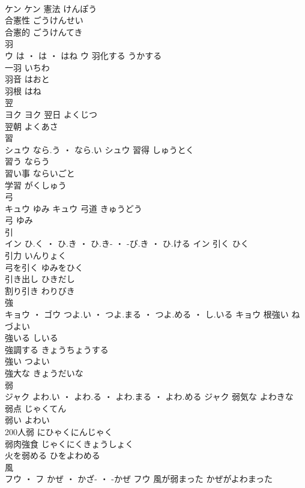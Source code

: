 \documentclass[8pt]{extreport}
\begin{document}
\begin{CJK}{UTF8}{min}
\\	ケン		ケン	憲法	けんぽう	
\\	合憲性	ごうけんせい	
\\	合憲的	ごうけんてき	
\\	羽	
\\	ウ	は ・ は ・ はね	ウ	羽化する	うかする	
\\	一羽	いちわ	
\\	羽音	はおと	
\\	羽根	はね	
\\	翌	
\\	ヨク		ヨク	翌日	よくじつ	
\\	翌朝	よくあさ	
\\	習	
\\	シュウ	なら.う ・ なら.い	シュウ	習得	しゅうとく	
\\	習う	ならう	
\\	習い事	ならいごと	
\\	学習	がくしゅう	
\\	弓	
\\	キュウ	ゆみ	キュウ	弓道	きゅうどう	
\\	弓	ゆみ	
\\	引	
\\	イン	ひ.く ・ ひ.き ・ ひ.き- ・ -び.き ・ ひ.ける	イン	引く	ひく	
\\	引力	いんりょく	
\\	弓を引く	ゆみをひく	
\\	引き出し	ひきだし	
\\	割り引き	わりびき	
\\	強	
\\	キョウ ・ ゴウ	つよ.い ・ つよ.まる ・ つよ.める ・ し.いる	キョウ	根強い	ねづよい	
\\	強いる	しいる	
\\	強調する	きょうちょうする	
\\	強い	つよい	
\\	強大な	きょうだいな	
\\	弱	
\\	ジャク	よわ.い ・ よわ.る ・ よわ.まる ・ よわ.める	ジャク	弱気な	よわきな	
\\	弱点	じゃくてん	
\\	弱い	よわい	
\\	200人弱	にひゃくにんじゃく	
\\	弱肉強食	じゃくにくきょうしょく	
\\	火を弱める	ひをよわめる	
\\	風	
\\	フウ ・ フ	かぜ ・ かざ- ・ -かぜ	フウ	風が弱まった	かぜがよわまった	

\end{CJK}
\end{document}
